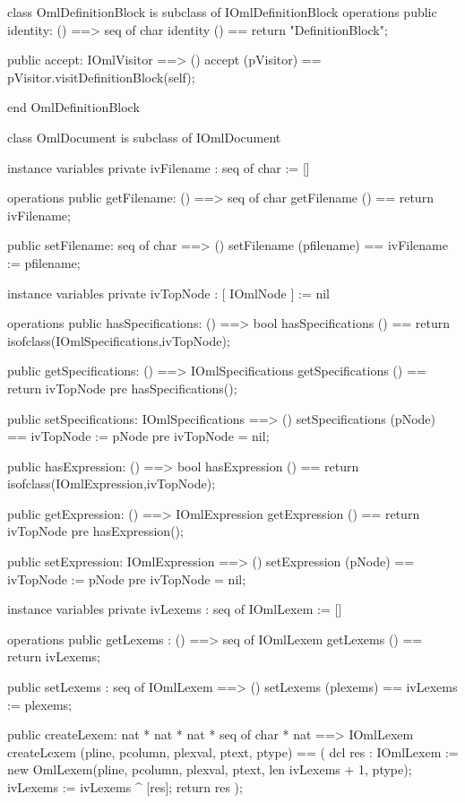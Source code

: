 \begin{vdm_al}
class OmlDefinitionBlock is subclass of IOmlDefinitionBlock
operations
  public identity: () ==> seq of char
  identity () == return "DefinitionBlock";

  public accept: IOmlVisitor ==> ()
  accept (pVisitor) == pVisitor.visitDefinitionBlock(self);

end OmlDefinitionBlock
\end{vdm_al}
\begin{vdm_al}
class OmlDocument is subclass of IOmlDocument

instance variables
  private ivFilename : seq of char := []

operations
  public getFilename: () ==> seq of char
  getFilename () == return ivFilename;

  public setFilename: seq of char ==> ()
  setFilename (pfilename) == ivFilename := pfilename;

instance variables
  private ivTopNode : [ IOmlNode ] := nil

operations
  public hasSpecifications: () ==> bool
  hasSpecifications () == return isofclass(IOmlSpecifications,ivTopNode);

  public getSpecifications: () ==> IOmlSpecifications
  getSpecifications () == return ivTopNode
    pre hasSpecifications();

  public setSpecifications: IOmlSpecifications ==> ()
  setSpecifications (pNode) == ivTopNode := pNode
    pre ivTopNode = nil;

  public hasExpression: () ==> bool
  hasExpression () == return isofclass(IOmlExpression,ivTopNode);

  public getExpression: () ==> IOmlExpression
  getExpression () == return ivTopNode
    pre hasExpression();

  public setExpression: IOmlExpression ==> ()
  setExpression (pNode) == ivTopNode := pNode
    pre ivTopNode = nil;

instance variables
  private ivLexems : seq of IOmlLexem := []

operations
  public getLexems : () ==> seq of IOmlLexem
  getLexems () == return ivLexems;

  public setLexems : seq of IOmlLexem ==> ()
  setLexems (plexems) == ivLexems := plexems;

  public createLexem: nat * nat * nat * seq of char * nat ==> IOmlLexem
  createLexem (pline, pcolumn, plexval, ptext, ptype) ==
    ( dcl res : IOmlLexem := new OmlLexem(pline, pcolumn, plexval, ptext, len ivLexems + 1, ptype);
      ivLexems := ivLexems ^ [res];
      return res );


\end{vdm_al}
